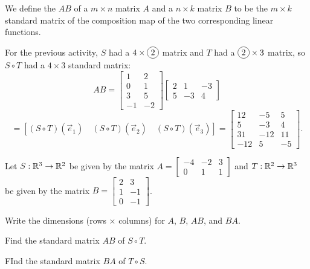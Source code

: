 \begin{definition}
We define the  \(AB\) of a \(m \times n\) matrix \(A\) and a
\(n \times k\)
matrix \(B\) to be the \(m \times k\) standard matrix of the composition map of the
two corresponding linear functions.

\vspace{1em}

For the previous activity, \(S\) had a \(4\times \circledNumber{2}\) matrix and
\(T\) had a \(\circledNumber{2}\times 3\) matrix, so \(S\circ T\) had a
\(4\times 3\) standard matrix:
\[
  AB
    =
  \begin{bmatrix} 1 & 2 \\ 0 & 1 \\ 3 & 5 \\ -1 & -2 \end{bmatrix}
  \begin{bmatrix} 2 & 1 & -3 \\ 5 & -3 & 4 \end{bmatrix}
\]
\[
    =
  \left[
  (S \circ T)(\vec{e}_1) \hspace{1em}
  (S\circ T)(\vec{e}_2) \hspace{1em}
  (S \circ T)(\vec{e}_3)
  \right]
    =
  \begin{bmatrix}
    12 & -5 & 5 \\
    5 & -3 & 4 \\
    31 & -12 & 11 \\
    -12 & 5 & -5
  \end{bmatrix}
.\]
\end{definition}



\begin{activity}{15}
Let \(S: \mathbb{R}^3 \rightarrow \mathbb{R}^2\) be given by the matrix 
\(A=\begin{bmatrix} -4 & -2 & 3 \\ 0 & 1 & 1 \end{bmatrix}\)
and \(T: \mathbb{R}^2 \rightarrow \mathbb{R}^3\) be given by the matrix
\(B=\begin{bmatrix} 2 & 3 \\ 1 & -1 \\ 0 & -1 \end{bmatrix}\).

\begin{subactivity}
Write the dimensions (rows \(\times\) columns)
for \(A\), \(B\), \(AB\), and \(BA\).
\end{subactivity}
\begin{subactivity}
Find the standard matrix \(AB\) of \(S \circ T\).
\end{subactivity}
\begin{subactivity}
FInd the standard matrix \(BA\) of \(T \circ S\).
\end{subactivity}
\end{activity}


